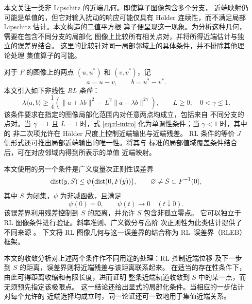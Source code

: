 本文关注一类非 Lipschitz 的近端几何。即使算子图像包含多个分支，
近端映射仍可能是单值的，但它对输入扰动的响应可能仅具有
H\"older 连续性，而不满足局部 Lipschitz 估计。本文构造的二值平方根
算子便呈现这一现象。为分析这种几何，需要在包含不同分支的局部化
图像上比较所有相关点对，并将所得近端估计与独立的误差界结合。
这里的比较针对同一局部邻域上的具体条件，并不排除其他理论处理
集值算子的可能。

对于 $F$ 的图像上的两点 $(u,u^*)$ 和 $(v,v^*)$，记
\[
 a=u-v,
 \qquad
 b=u^*-v^*.
\]
本文引入如下非线性 \emph{RL 条件}：
\begin{equation}
 \lambda\langle a,b\rangle
 \geq
 \frac14\left(
   \|a+\lambda b\|^2
   -L^2\|a+\lambda b\|^{2\gamma}
 \right),
 \qquad
 L\geq0,\quad 0<\gamma\leq1.
 \label{eq:rl-intro}
\end{equation}
该条件要求在指定的图像局部化范围内对任意两点均成立，包括来自
不同分支的点对。当 $\gamma=1$ 且 $L=1$ 时，式
\eqref{eq:rl-intro} 化为单调性条件；当 $\gamma<1$ 时，其中的
非二次项允许在 H\"older 尺度上控制近端输出与近端残差。
RL 条件的等价 $J$ 侧形式还可推出局部近端输出的唯一性。将其与
标准的局部值域覆盖条件结合后，可在对应邻域内得到所表示的单值
近端映射。

本文使用的另一个条件是广义度量次正则性误差界
\begin{equation}
 \operatorname{dist}(y,S)
 \leq
 \psi\bigl(\operatorname{dist}(0,F(y))\bigr),
 \qquad
 \varnothing\ne S\subset F^{-1}(0),
 \label{eq:eb-intro}
\end{equation}
其中 $S$ 为闭集，$\psi$ 为非减函数，且满足
\[
 \psi(0)=0,
 \qquad
 \psi(t)\to0
 \quad (t\downarrow0).
\]
该误差界利用残差控制到 $S$ 的距离，并允许 $S$ 包含非孤立零点。
它可以独立于 RL 图像条件进行验证。斜率准则、广义微分与高阶
次正则性为此类估计提供了不同来源
\cite{Kruger2015ErrorBounds,
MordukhovichOuyang2015HigherOrderSubregularity,
LiMordukhovichZhu2026GeneralizedSubregularity}。
下文将 RL 图像几何与这一误差界的结合称为
RL--误差界（RLEB）框架。

本文的收敛分析对上述两个条件作不同用途的处理：RL 控制近端位移
及下一步到 $S$ 的距离，误差界则将近端残差与该距离联系起来。
在适当的存在性条件下，由此可得距离收缩和有限长度，进而证明
整条近端轨道收敛到 $S$ 中的某一点，而无须预先指定该极限点。
这一结论还给出显式的局部化条件。当相应的一步估计对每个允许的
近端选择均成立时，同一论证还可一致地用于集值近端关系。

